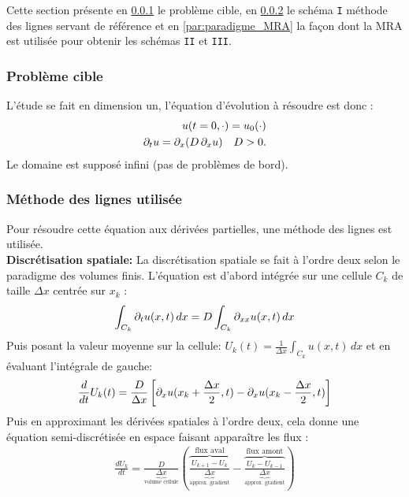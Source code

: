 Cette section présente en \ref{par:contrib2_target} le problème cible, en \ref{par:contrib2_MoL} le schéma \texttt{I} méthode des lignes servant de référence et en \ref{par:paradigme_MRA} la façon dont la MRA est utilisée pour obtenir les schémas \texttt{II} et \texttt{III}.
\subsubsection{Problème cible}\label{par:contrib2_target}

    L'étude se fait en dimension un, l'équation d'évolution à résoudre est donc :
    \begin{align}
        u(t = 0 , \cdot) = u_0(\cdot) \\
        \partial_t u = \partial_x ( D \, \partial_x u) \quad D >0.
    \end{align}
    Le domaine est supposé infini (pas de problèmes de bord).
        \subsubsection{Méthode des lignes utilisée}\label{par:contrib2_MoL}
            Pour résoudre cette équation aux dérivées partielles, une méthode des lignes est utilisée.\\
            \textbf{Discrétisation spatiale: }
            La discrétisation spatiale se fait à l'ordre deux selon le paradigme des volumes finis.
            L'équation est d'abord intégrée sur une cellule $C_k$ de taille $\Delta x$ centrée sur $x_k$ : 
            \begin{align}
                \int_{C_k} \partial_t u(x,t) \, dx = D \int_{C_k} \partial_{xx} u(x,t) \, dx 
            \end{align}
            Puis posant la valeur moyenne sur la cellule: $U_k(t) = \frac{1}{\Delta x} \int_{C_k} u(x,t) \, dx$ et en évaluant l'intégrale de gauche:  
            \begin{align}
                \frac{d}{dt} U_k(t) = \frac{D}{\Delta x} \left[ \partial_x u(x_k + \frac{\Delta x}{2},t) - \partial_x u(x_k - \frac{\Delta x}{2},t)\right]
            \end{align}
            Puis en approximant les dérivées spatiales à l'ordre deux, cela donne une équation semi-discrétisée 
            en espace faisant apparaître les flux : 
        \begin{align}
            \frac{dU_k}{dt}
            = \frac{D}{\underbrace{\Delta x}_{\text{volume cellule}}}
                \left(
                \overbrace{\frac{U_{k+1}-U_k}{\underbrace{\Delta x}_{\text{approx. gradient}}}}^{\text{flux aval}}
                -
                \overbrace{\frac{U_k-U_{k-1}}{\underbrace{\Delta x}_{\text{approx. gradient}}}}^{\text{flux amont}}
                \right)
        \end{align}

